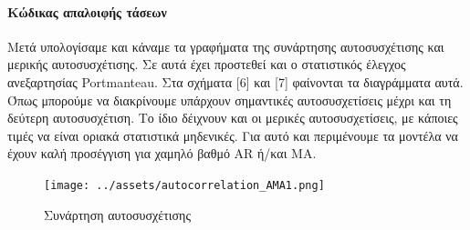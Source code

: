 \documentclass[11pt,]{article}
\newenvironment{Shaded}{}{}
\newcommand{\CommentTok}[1]{\textcolor[rgb]{0.38,0.63,0.69}{\textit{#1}}}
\newcommand{\FloatTok}[1]{\textcolor[rgb]{0.25,0.63,0.44}{#1}}
\newcommand{\NormalTok}[1]{#1}
\newcommand{\StringTok}[1]{\textcolor[rgb]{0.25,0.44,0.63}{#1}}
\let\oldparagraph\paragraph
\renewcommand{\paragraph}[1]{\oldparagraph{#1}\mbox{}}
\begin{document}
\hypertarget{ux3baux3ceux3b4ux3b9ux3baux3b1ux3c2-ux3b1ux3c0ux3b1ux3bbux3bfux3b9ux3c6ux3aeux3c2-ux3c4ux3acux3c3ux3b5ux3c9ux3bd}{%
\paragraph{Κώδικας απαλοιφής
τάσεων}\label{ux3baux3ceux3b4ux3b9ux3baux3b1ux3c2-ux3b1ux3c0ux3b1ux3bbux3bfux3b9ux3c6ux3aeux3c2-ux3c4ux3acux3c3ux3b5ux3c9ux3bd}}

\begin{Shaded}
\end{Shaded}

Μετά υπολογίσαμε και κάναμε τα γραφήματα της συνάρτησης αυτοσυσχέτισης
και μερικής αυτοσυσχέτισης. Σε αυτά έχει προστεθεί και ο στατιστικός
έλεγχος ανεξαρτησίας Portmanteau. Στα σχήματα {[}6{]} και {[}7{]}
φαίνονται τα διαγράμματα αυτά. Όπως μπορούμε να διακρίνουμε υπάρχουν
σημαντικές αυτοσυσχετίσεις μέχρι και τη δεύτερη αυτοσυσχέτιση. Το ίδιο
δέιχνουν και οι μερικές αυτοσυσχετίσεις, με κάποιες τιμές να είναι
οριακά στατιστικά μηδενικές. Για αυτό και περιμένουμε τα μοντέλα να
έχουν καλή προσέγγιση για χαμηλό βαθμό AR ή/και MA.

\begin{figure}
\centering
\texttt{[image: ../assets/autocorrelation\_AMA1.png]}
\caption{Συνάρτηση αυτοσυσχέτισης}
\end{figure}
\end{document}
